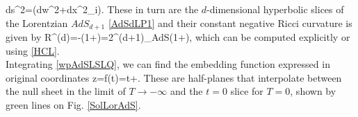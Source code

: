 \documentclass[a4paper,12pt]{article}
\begin{document}
\be
ds^2=\left(dw^2+dx^2_i\right).\label{SolutionAdSS}
\ee
These in turn are the $d$-dimensional hyperbolic slices of the Lorentzian $AdS_{d+1}$ \eqref{AdSdLP1} and their constant negative Ricci curvature is given by
\be
R^{(d)}=-\left(1+\right)=2\Lambda^{(d+1)}_{AdS}\left(1+\right),
\ee
which can be computed explicitly or using \eqref{HCL}.\\
Integrating \eqref{wpAdSLSLQ}, we can find the embedding function expressed in original coordinates 
\be
z=f(t)=t+\epsilon.\label{AdSLSL}
\ee
These are half-planes that interpolate between the null sheet in the limit of $T\to-\infty$ and the $t=0$ slice for $T=0$, shown by green lines on Fig. \ref{SolLorAdS}.
\end{document}
